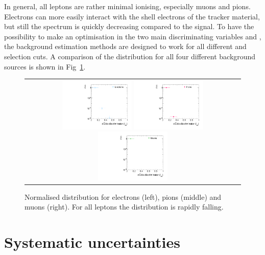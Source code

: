 In general, all leptons are rather minimal ionising, especially muons and pions.
Electrons can more easily interact with the shell electrons of the tracker material, but still the \ias spectrum is quickly decreasing compared to the signal.
To have the possibility to make an optimisation in the two main discriminating variables \pt and \ias, the background estimation methods are designed to work for all different \pt and \ias selection cuts.
A comparison of the \ias distribution for all four different background sources is shown in Fig~\ref{fig:IasDist}.
\begin{figure}[!tb]
  \centering 
  \begin{tabular}{c}
    \includegraphics[width=0.33\textwidth]{figures/analysis/IasDistributionForElecs.pdf}
    \includegraphics[width=0.33\textwidth]{figures/analysis/IasDistributionForPions.pdf}
    \includegraphics[width=0.33\textwidth]{figures/analysis/IasDistributionForMuons.pdf}
  \end{tabular}
  \caption{Normalised \ias distribution for electrons (left), pions (middle) and muons (right). 
           For all leptons the \ias distribution is rapidly falling.}
  \label{fig:IasDist}
\end{figure}

\section{Systematic uncertainties}
\label{sec:SysUncertaintiesBkg}


